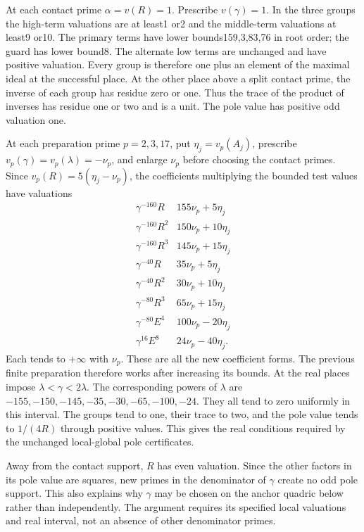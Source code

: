 At each contact prime $\alpha=v(R)=1$. Prescribe $v(\gamma)=1$.
In the three groups the high-term valuations are at least1
or2 and the middle-term valuations at least9 or10. The primary
terms have lower bounds159,3,83,76 in root order; the guard has
lower bound8. The alternate low terms are unchanged and have
positive valuation. Every group is therefore one plus an
element of the maximal ideal at the successful place.
At the other place above a split contact prime, the inverse
of each group has residue zero or one. Thus the trace of the
product of inverses has residue one or two and is a unit.
The pole value has positive odd valuation one.

At each preparation prime $p=2,3,17$, put
$\eta_j=v_p(A_j)$, prescribe $v_p(\gamma)=v_p(\lambda)=-\nu_p$,
and enlarge $\nu_p$ before choosing the contact primes.
Since $v_p(R)=5(\eta_j-\nu_p)$, the coefficients multiplying
the bounded test values have valuations
\[
\begin{array}{c|c}
 \gamma^{-160}R&155\nu_p+5\eta_j\\
 \gamma^{-160}R^2&150\nu_p+10\eta_j\\
 \gamma^{-160}R^3&145\nu_p+15\eta_j\\
 \gamma^{-40}R&35\nu_p+5\eta_j\\
 \gamma^{-40}R^2&30\nu_p+10\eta_j\\
 \gamma^{-80}R^3&65\nu_p+15\eta_j\\
 \gamma^{-80}E^4&100\nu_p-20\eta_j\\
 \gamma^{16}E^8&24\nu_p-40\eta_j .
\end{array}
\]
Each tends to $+\infty$ with $\nu_p$. These are all the new
coefficient forms. The previous finite preparation therefore
works after increasing its bounds.
At the real places impose $\lambda<\gamma<2\lambda$.
The corresponding powers of $\lambda$ are
$-155,-150,-145,-35,-30,-65,-100,-24$.
They all tend to zero uniformly in this interval. The groups
tend to one, their trace to two, and the pole value tends to
$1/(4R)$ through positive values. This gives the real conditions
required by the unchanged local-global pole certificates.

Away from the contact support, $R$ has even valuation. Since
the other factors in its pole value are squares, new primes in
the denominator of $\gamma$ create no odd pole support.
This also explains why $\gamma$ may be chosen on the anchor
quadric below rather than independently. The argument requires
its specified local valuations and real interval, not an
absence of other denominator primes.

